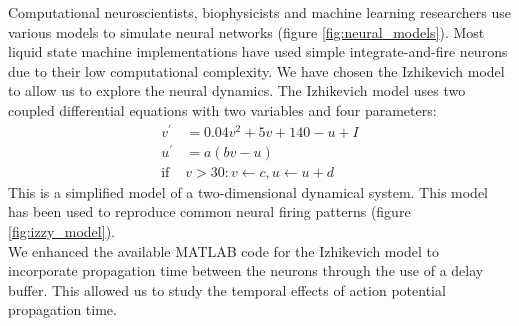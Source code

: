 \documentclass[a4paper,11pt]{article}
\begin{document}
Computational neuroscientists, biophysicists and machine learning researchers use various models to simulate neural networks (figure \ref{fig:neural_models}).
Most liquid state machine implementations have used simple integrate-and-fire neurons due to their low computational complexity.
We have chosen the Izhikevich model \cite{izhikevich2003} to allow us to explore the neural dynamics.
The Izhikevich model uses two coupled differential equations with two variables and four parameters:
\begin{align}
 v^\prime &= 0.04v^2+5v+140-u+I\\
 u^\prime &= a(bv-u)\\
 \text{if } &v>30: v\leftarrow c, u\leftarrow u+d
\end{align}
This is a simplified model of a two-dimensional dynamical system.
This model has been used to reproduce common neural firing patterns (figure \ref{fig:izzy_model}). \\
We enhanced the available MATLAB code for the Izhikevich model to incorporate propagation time between the neurons through the use of a delay buffer.
This allowed us to study the temporal effects of action potential propagation time.
\end{document}
